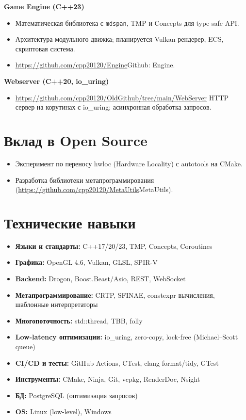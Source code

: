 \documentclass[a4paper,10pt]{article}
\begin{document}
\textbf{Game Engine (C++23)}  
\begin{itemize}[noitemsep]
    \item Математическая библиотека с \texttt{mdspan}, TMP и Concepts для type-safe API.
    \item Архитектура модульного движка; планируется Vulkan-рендерер, ECS, скриптовая система.
    \item \url{https://github.com/cpp20120/Engine}{Github: Engine}.
\end{itemize}

\textbf{Webserver (C++20, io\_uring)}  
\begin{itemize}[noitemsep]
    \item \url{https://github.com/cpp20120/OldGithub/tree/main/WebServer} HTTP сервер на корутинах с io\_uring; асинхронная обработка запросов.
\end{itemize}

\section*{Вклад в Open Source}
\begin{itemize}[noitemsep]
    \item Эксперимент по переносу hwloc (Hardware Locality) с autotools на CMake.
    \item Разработка библиотеки метапрограммирования (\url{https://github.com/cpp20120/MetaUtils}{MetaUtils}).
\end{itemize}

\section*{Технические навыки}
\begin{itemize}[noitemsep]
    \item \textbf{Языки и стандарты:} C++17/20/23, TMP, Concepts, Coroutines
    \item \textbf{Графика:} OpenGL 4.6, Vulkan, GLSL, SPIR-V
    \item \textbf{Backend:} Drogon, Boost.Beast/Asio, REST, WebSocket
    \item \textbf{Метапрограммирование:} CRTP, SFINAE, constexpr вычисления, шаблонные интерпретаторы
    
    \item \textbf{Многопоточность:} std::thread, TBB, folly
    \item \textbf{Low-latency оптимизации:} io\_uring,  zero-copy, lock-free (Michael–Scott queue)
    \item \textbf{CI/CD и тесты:} GitHub Actions, CTest, clang-format/tidy, GTest
    \item \textbf{Инструменты:} CMake, Ninja, Git, vcpkg, RenderDoc, Nsight
    \item \textbf{БД:} PostgreSQL (оптимизация запросов)
    \item \textbf{OS:} Linux (low-level), Windows
\end{itemize}
\end{document}
